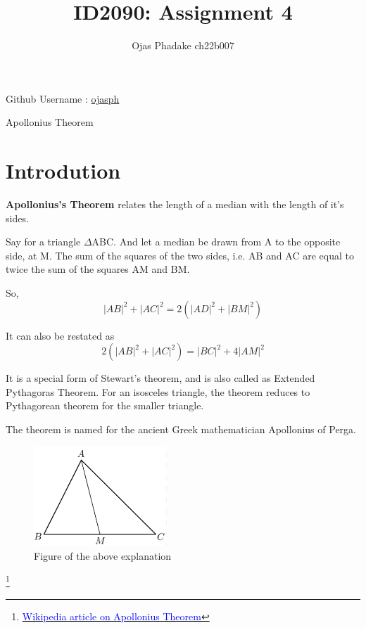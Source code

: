 \documentclass[pdftex]{article}
\title{\textbf{ID2090: Assignment 4}}
\author{Ojas Phadake ch22b007}
\begin{document}
    \maketitle
    \begin{center}
    {Github Username : \href{https://github.com/ojasph}{ojasph} }
\end{center}
{\Huge\begin{center}
    Apollonius Theorem
      \end{center}} 

\section{Introdution}
\textbf{Apollonius's Theorem} relates the length of  a median with the length of it's sides. 

Say for a triangle $\Delta$ABC. And let a median be drawn from A to the opposite side, at M. The sum of the squares of the two sides, i.e. AB and AC are equal to twice the sum of the squares AM and BM. 

So, 
\begin{equation}
    |AB|^2 + |AC|^2 = 2(|AD|^2 + |BM|^2)
\end{equation}

It can also be restated as 
\begin{equation}
    2(|AB|^2 + |AC|^2) = |BC|^2 + 4|AM|^2
\end{equation}

It is a special form of Stewart's theorem, and is also called as Extended Pythagoras Theorem. For an isosceles triangle, the theorem reduces to Pythagorean theorem for the smaller triangle. 

The theorem is named for the ancient Greek mathematician Apollonius of Perga.

\begin{figure}[H]
    \centering
    \includegraphics[width = 5cm]{Screenshot 2023-06-13 235751.png}
    \caption{Figure of the above explanation}
\end{figure}

\footnote
{\href{https://en.wikipedia.org/wiki/Apollonius\%27s\_theorem}{\textcolor{blue}{Wikipedia article on Apollonius Theorem}}}
\end{document}
